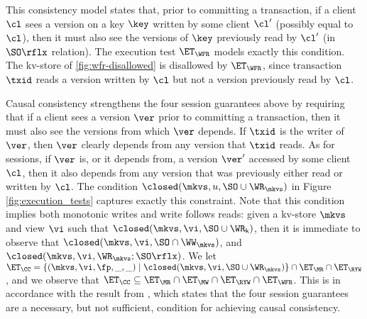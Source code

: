 

This consistency model states that, prior to committing a transaction, 
if a client $\cl$ sees a version on a key $\key$ written by some
client $\cl'$ (possibly equal to $\cl$), then it must also see the versions of $\key$ previously read by $\cl'$ (in $\SO\rflx$ relation). 
The execution test $\ET_{\WFR}$ models exactly this condition.
The kv-store of \cref{fig:wfr-disallowed} is disallowed by $\ET_{\WFR}$,
since transaction $\txid$ reads a version written by $\cl$ but
not a version previously read by $\cl$.

Causal consistency strengthens the four session guarantees above by requiring 
that if a client sees a version 
$\ver$ prior to committing a transaction, then it must also see the versions 
from which $\ver$ depends.
If $\txid$ is the writer of $\ver$, then 
$\ver$ clearly depends from any version that $\txid$ reads. 
As for sessions, if $\ver$ is, or it depends from, a version $\ver'$ accessed by 
some client $\cl$, then it also depends from any version that was previously 
either read or written by $\cl$. The condition $\closed(\mkvs, u, \SO \cup \WR_{\mkvs})$ 
in Figure \ref{fig:execution_tests} captures exactly this constraint. 
Note that this condition implies both monotonic writes and write follows reads: 
given a kv-store $\mkvs$ and view $\vi$ such that 
$\closed(\mkvs, \vi, \SO \cup \WR_{\mathsf{k}})$,
then it is immediate to observe that $\closed(\mkvs, \vi, \SO \cap \WW_\mkvs)$, 
and $\closed(\mkvs, \vi, \WR_{\mkvs};\SO\rflx)$. We let $\ET_{\CC} = 
\{(\mkvs, \vi, \fp, \_, \_) \mid \closed(\mkvs, \vi, \SO \cup \WR_{\mkvs})\} \cap \ET_{\MR} 
\cap \ET_{\RYW}$, and we observe that $\ET_{\CC} \subseteq \ET_{\MR} \cap \ET_{\MW} 
\cap \ET_{\RYW} \cap \ET_{\WFR}$. This is in accordance with the result from 
, which states that the four session guarantees are a necessary, but 
not sufficient, condition for achieving causal consistency.
